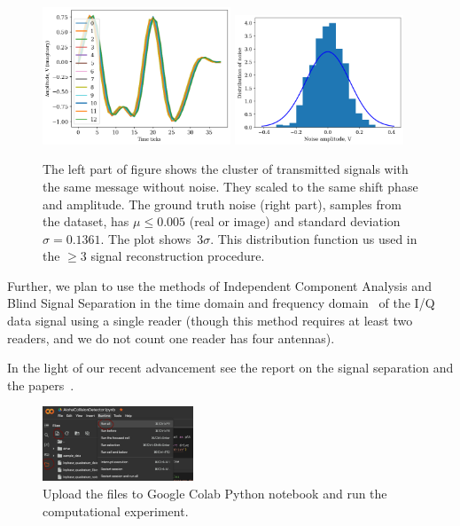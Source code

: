 \documentclass[12pt]{article}
\begin{document}
\begin{figure}[!h]
\centering
\includegraphics[width=0.5\textwidth]{fig_cluster}
\includegraphics[width=0.45\textwidth]{fig_noise_pdf}
\caption{The left part of figure shows the cluster of transmitted signals with the same message without noise. They scaled to the same shift phase and amplitude.  The ground truth noise (right part), samples from the dataset, has $\mu\leq 0.005$ (real or image) and standard deviation~$\sigma =  0.1361$. The plot shows~$3 \sigma$. This distribution function us used in the $\geq 3$ signal reconstruction procedure. }  %
\label{fig:demo}
\end{figure}

Further, we plan to use the methods of Independent Component Analysis and Blind Signal Separation in the time domain and frequency domain~\cite{Hyvaerinen2000,Elliott1999} of the I/Q data signal using a single reader (though this method requires at least two readers, and we do not count one reader has four antennas). 

In the light of our recent advancement see the report on the signal separation and the papers~\cite{Katrutsa2017,Katrutsa2015}.

\begin{figure}[!h]
\centering
\includegraphics[width=0.4\textwidth]{fig_demo_upload}
\caption{Upload the files to Google Colab Python notebook and run the computational experiment.}
\label{fig:demo}
\end{figure}
\end{document}
